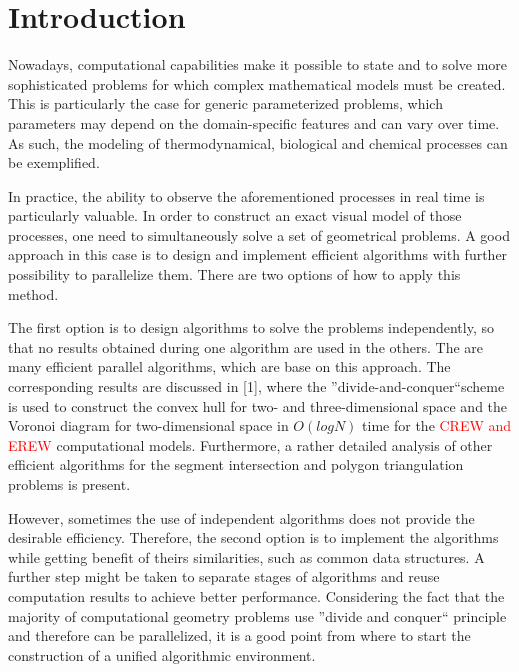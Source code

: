 \documentclass[conference]{IEEEtran}
\theoremstyle{plane}
\begin{document}
\section{Introduction}

Nowadays, computational capabilities make it possible to state and to solve more sophisticated problems for which complex mathematical models must be created. This is particularly the case for generic parameterized problems, which parameters may depend on the domain-specific features and can vary over time. As such, the modeling of thermodynamical, biological and chemical processes can be exemplified.

In practice, the ability to observe the aforementioned processes in real time is particularly valuable. In order to construct an exact visual model of those processes, one need to simultaneously solve a set of geometrical problems. A good approach in this case is to design and implement efficient algorithms with further possibility to parallelize them. There are two options of how to apply this method.

The first option is to design algorithms to solve the problems independently, so that no results obtained during one algorithm are used in the others. The are many efficient parallel algorithms, which are base on this approach. The corresponding results are discussed in [1], where the ''divide-and-conquer``scheme is used to construct the convex hull for two- and three-dimensional space and the Voronoi diagram for two-dimensional space in $O(log N)$ time for the \textcolor{red}{CREW and EREW} computational models.  Furthermore, a rather detailed analysis of other efficient algorithms for the segment intersection and polygon triangulation problems is present.

However, sometimes the use of independent algorithms does not provide the desirable efficiency. Therefore, the second option is to implement the algorithms while getting benefit of theirs similarities, such as common data structures. A further step might be taken to separate stages of algorithms and reuse computation results to achieve better performance. Considering the fact that the majority of computational geometry problems use ''divide and conquer`` principle and therefore can be parallelized, it is a good point from where to start the construction of a unified algorithmic environment.
\end{document}
